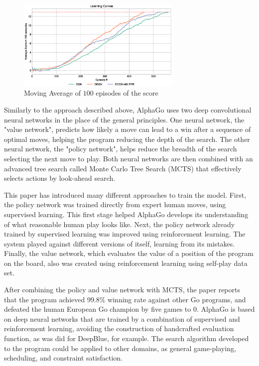 \documentclass[a4paper]{article}
\begin{document}
\begin{figure}[ht]
\centering
\includegraphics[width=0.7\textwidth]{../notebooks/figures/2018-08-23-final-comparition-2.eps}
\caption{Moving Average of $100$ episodes of the score}
\label{fig:rwd_funcs}
\end{figure}


Similarly to the approach described above, AlphaGo uses two deep convolutional neural networks in the place of the general principles. One neural network, the "value network", predicts how likely a move can lead to a win after a sequence of optimal moves, helping the program reducing the depth of the search. The other neural network, the "policy network", helps reduce the breadth of the search selecting the next move to play. Both neural networks are then combined with an advanced tree search called Monte Carlo Tree Search (MCTS) that effectively selects actions by look-ahead search.




This paper has introduced many different approaches to train the model. First, the policy network was trained directly from expert human moves, using supervised learning. This first stage helped AlphaGo develops its understanding of what reasonable human play looks like. Next, the policy network already trained by supervised learning was improved using reinforcement learning. The system played against different versions of itself, learning from its mistakes. Finally, the value network, which evaluates the value of a position of the program on the board, also was created using reinforcement learning using self-play data set.

After combining the policy and value network with MCTS, the paper reports that the program achieved 99.8\% winning rate against other Go programs, and defeated the human European Go champion by five games to 0. AlphaGo is based on deep neural networks that are trained by a combination of supervised and reinforcement learning, avoiding the construction of handcrafted evaluation function, as was did for DeepBlue, for example. The search algorithm developed to the program could be applied to other domains, as general game-playing, scheduling, and constraint satisfaction.








\end{document}
